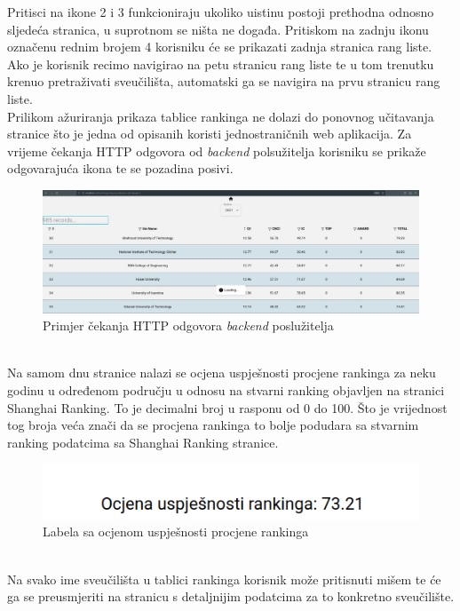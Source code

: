 \documentclass[times, utf8, zavrsni]{fer}
\begin{document}
Pritisci na ikone 2 i 3 funkcioniraju ukoliko uistinu postoji prethodna odnosno sljedeća stranica, u suprotnom se ništa ne događa.
Pritiskom na zadnju ikonu označenu rednim brojem 4 korisniku će se prikazati zadnja stranica rang liste. 
\\Ako je korisnik recimo navigirao na petu stranicu rang liste te u tom trenutku krenuo pretraživati sveučilišta, automatski ga se navigira na prvu stranicu rang liste.
\\Prilikom ažuriranja prikaza tablice rankinga ne dolazi do ponovnog učitavanja stranice što je jedna od opisanih koristi jednostraničnih web aplikacija.
Za vrijeme čekanja HTTP odgovora od \emph{backend} polsužitelja korisniku se prikaže odgovarajuća ikona te se pozadina posivi.
\begin{figure}[htb]
    \hspace*{-2cm}  
       \includegraphics[scale=0.21]{loading.png} 
       \caption{Primjer čekanja HTTP odgovora \emph{backend} poslužitelja}
       \label{fig:sort2}
       \end{figure}
\\Na samom dnu stranice nalazi se ocjena uspješnosti procjene rankinga za neku godinu u određenom području u odnosu na stvarni 
ranking objavljen na stranici Shanghai Ranking. To je decimalni broj u rasponu od 0 do 100. Što je vrijednost tog broja veća znači da se procjena 
rankinga to bolje podudara sa stvarnim ranking podatcima sa Shanghai Ranking stranice. 
\begin{figure}[htb]
    \centering
       \includegraphics[scale=0.4]{uspjeh.png} 
       \caption{Labela sa ocjenom uspješnosti procjene rankinga}
       \label{fig:uspjeh}
       \end{figure}
\\Na svako ime sveučilišta u tablici rankinga korisnik može pritisnuti mišem te će ga se preusmjeriti na stranicu s detaljnijim podatcima za to konkretno sveučilište.
\end{document}

